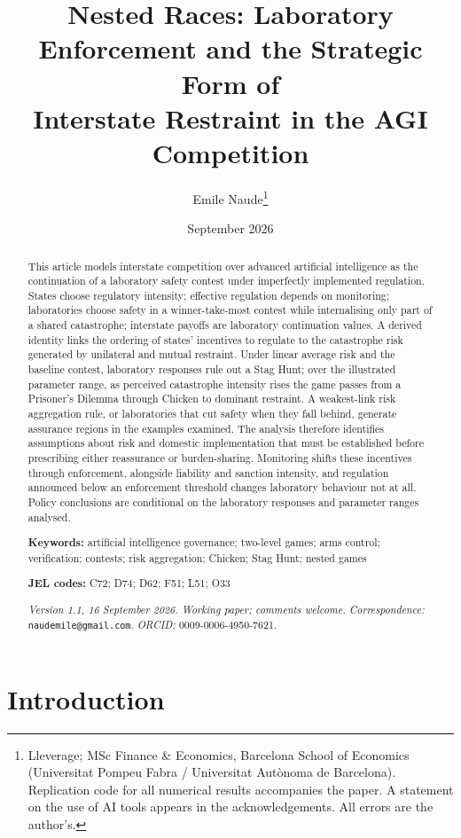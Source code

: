 \documentclass[11pt]{article}
\title{Nested Races: Laboratory Enforcement and the Strategic Form of\\ Interstate Restraint in the AGI Competition}
\author{Emile Naude\thanks{Lleverage; MSc Finance \& Economics, Barcelona School of Economics (Universitat Pompeu Fabra / Universitat Autònoma de Barcelona). Replication code for all numerical results accompanies the paper. A statement on the use of AI tools appears in the acknowledgements. All errors are the author's.}}
\date{September 2026}
\theoremstyle{plain}
\theoremstyle{definition}
\theoremstyle{remark}
\begin{document}
\maketitle

\begin{abstract}
\noindent This article models interstate competition over advanced artificial intelligence as the continuation of a laboratory safety contest under imperfectly implemented regulation. States choose regulatory intensity; effective regulation depends on monitoring; laboratories choose safety in a winner-take-most contest while internalising only part of a shared catastrophe; interstate payoffs are laboratory continuation values. A derived identity links the ordering of states' incentives to regulate to the catastrophe risk generated by unilateral and mutual restraint. Under linear average risk and the baseline contest, laboratory responses rule out a Stag Hunt; over the illustrated parameter range, as perceived catastrophe intensity rises the game passes from a Prisoner's Dilemma through Chicken to dominant restraint. A weakest-link risk aggregation rule, or laboratories that cut safety when they fall behind, generate assurance regions in the examples examined. The analysis therefore identifies assumptions about risk and domestic implementation that must be established before prescribing either reassurance or burden-sharing. Monitoring shifts these incentives through enforcement, alongside liability and sanction intensity, and regulation announced below an enforcement threshold changes laboratory behaviour not at all. Policy conclusions are conditional on the laboratory responses and parameter ranges analysed.

\medskip\noindent\textbf{Keywords:} artificial intelligence governance; two-level games; arms control; verification; contests; risk aggregation; Chicken; Stag Hunt; nested games

\noindent\textbf{JEL codes:} C72; D74; D62; F51; L51; O33

\noindent\textit{Version 1.1, 16 September 2026. Working paper; comments welcome.} \textit{Correspondence:} \texttt{naudemile@gmail.com}. \textit{ORCID:} 0009-0006-4950-7621.
\end{abstract}

\section{Introduction}
\end{document}
